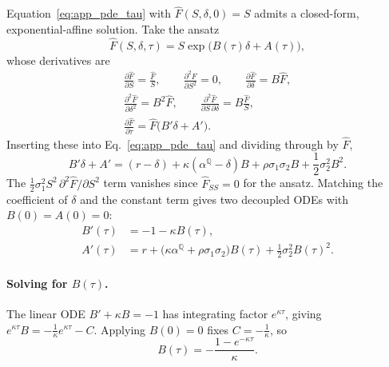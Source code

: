 \documentclass[sigconf, authorversion=true, nonacm=true]{acmart}
\newcommand{\convyield}{\delta}             %
\newcommand{\meanrev}{\kappa}               %
\newcommand{\longrun}{\alpha}               %
\begin{document}
Equation~\ref{eq:app_pde_tau} with $\hat{F}(S, \convyield, 0) = S$ admits a closed-form, exponential-affine solution. Take the ansatz
\begin{equation}
  \label{eq:app_ansatz}
  \hat{F}(S, \convyield, \tau) = S\exp\!\big(B(\tau)\convyield + A(\tau)\big),
\end{equation}
\noindent
whose derivatives are
\begin{equation}
  \label{eq:app_derivs}
  \begin{gathered}
  \frac{\partial \hat{F}}{\partial S} = \frac{\hat{F}}{S},
  \qquad
  \frac{\partial^2 \hat{F}}{\partial S^2} = 0,
  \qquad
  \frac{\partial \hat{F}}{\partial \convyield} = B\hat{F}, \\
  \frac{\partial^2 \hat{F}}{\partial \convyield^2} = B^2\hat{F},
  \qquad
  \frac{\partial^2 \hat{F}}{\partial S\,\partial \convyield} = B\frac{\hat{F}}{S}, \\
  \frac{\partial \hat{F}}{\partial \tau} = \hat{F}\big(B'\convyield + A'\big).
  \end{gathered}
\end{equation}
\noindent
Inserting these into Eq.~\ref{eq:app_pde_tau} and dividing through by $\hat{F}$,
\begin{equation}
  \label{eq:app_substituted}
  B'\convyield + A'
  = (r - \convyield)
  + \meanrev(\longrun^{\mathbb{Q}} - \convyield)B
  + \rho\sigma_1\sigma_2 B
  + \frac{1}{2}\sigma_2^2 B^2.
\end{equation}
\noindent
The $\tfrac{1}{2}\sigma_1^2 S^2\,\partial^2\hat{F}/\partial S^2$ term vanishes since $\hat{F}_{SS} = 0$ for the ansatz. Matching the coefficient of $\convyield$ and the constant term gives two decoupled ODEs with $B(0) = A(0) = 0$:
\begin{align}
  \label{eq:app_ode_B}
  B'(\tau) &= -1 - \meanrev B(\tau), \\
  \label{eq:app_ode_A}
  A'(\tau) &= r + \big(\meanrev\longrun^{\mathbb{Q}} + \rho\sigma_1\sigma_2\big)B(\tau) + \frac{1}{2}\sigma_2^2 B(\tau)^2.
\end{align}

\paragraph{Solving for $B(\tau)$.} The linear ODE $B' + \meanrev B = -1$ has integrating factor $e^{\meanrev\tau}$, giving $e^{\meanrev\tau}B = -\tfrac{1}{\meanrev}e^{\meanrev\tau} - C$. Applying $B(0) = 0$ fixes $C = -\tfrac{1}{\meanrev}$, so
\begin{equation}
  \label{eq:app_B}
  B(\tau) = -\frac{1 - e^{-\meanrev\tau}}{\meanrev}.
\end{equation}
\end{document}
